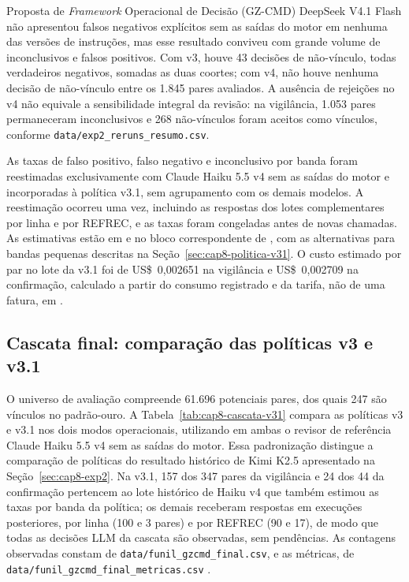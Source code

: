 \begin{chapter}{Proposta de \textit{Framework} Operacional de Decisão (GZ-CMD)}
DeepSeek V4.1 Flash não apresentou falsos negativos explícitos sem as saídas do motor em nenhuma das versões de instruções, mas esse resultado conviveu com grande volume de inconclusivos e falsos positivos. Com v3, houve 43 decisões de não-vínculo, todas verdadeiros negativos, somadas as duas coortes; com v4, não houve nenhuma decisão de não-vínculo entre os 1.845 pares avaliados. A ausência de rejeições no v4 não equivale a sensibilidade integral da revisão: na vigilância, 1.053 pares permaneceram inconclusivos e 268 não-vínculos foram aceitos como vínculos, conforme \texttt{data/exp2\_reruns\_resumo.csv}.

As taxas de falso positivo, falso negativo e inconclusivo por banda foram reestimadas exclusivamente com Claude Haiku 5.5 v4 sem as saídas do motor e incorporadas à política v3.1, sem agrupamento com os demais modelos. A reestimação ocorreu uma vez, incluindo as respostas dos lotes complementares por linha e por REFREC, e as taxas foram congeladas antes de novas chamadas. As estimativas estão em  e no bloco correspondente de , com as alternativas para bandas pequenas descritas na Seção~\ref{sec:cap8-politica-v31}. O custo estimado por par no lote da v3.1 foi de US\$~0,002651 na vigilância e US\$~0,002709 na confirmação, calculado a partir do consumo registrado e da tarifa, não de uma fatura, em  \cite{Jardim2026phdrepo}.

\subsection{Cascata final: comparação das políticas v3 e v3.1}
\label{sec:cap8-cascata}

O universo de avaliação compreende 61.696 potenciais pares, dos quais 247 são vínculos no padrão-ouro. A Tabela~\ref{tab:cap8-cascata-v31} compara as políticas v3 e v3.1 nos dois modos operacionais, utilizando em ambas o revisor de referência Claude Haiku 5.5 v4 sem as saídas do motor. Essa padronização distingue a comparação de políticas do resultado histórico de Kimi K2.5 apresentado na Seção~\ref{sec:cap8-exp2}. Na v3.1, 157 dos 347 pares da vigilância e 24 dos 44 da confirmação pertencem ao lote histórico de Haiku v4 que também estimou as taxas por banda da política; os demais receberam respostas em execuções posteriores, por linha (100 e 3 pares) e por REFREC (90 e 17), de modo que todas as decisões LLM da cascata são observadas, sem pendências. As contagens observadas constam de \texttt{data/funil\_gzcmd\_final.csv}, e as métricas, de \texttt{data/funil\_gzcmd\_final\_metricas.csv} \cite{Jardim2026phdrepo}.


\end{chapter}

